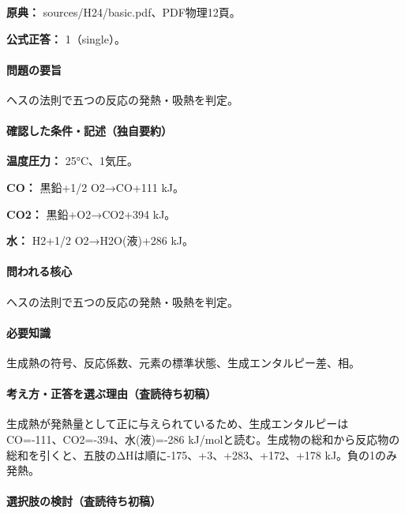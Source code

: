 \noindent\textbf{原典：} sources/H24/basic.pdf、PDF物理12頁。

\textbf{公式正答：} 1（single）。

\paragraph{問題の要旨} ヘスの法則で五つの反応の発熱・吸熱を判定。

\paragraph{確認した条件・記述（独自要約）}\mbox{}\par

\noindent\textbf{温度圧力：} 25°C、1気圧。\par

\noindent\textbf{CO：} 黒鉛+1/2 O2→CO+111 kJ。\par

\noindent\textbf{CO2：} 黒鉛+O2→CO2+394 kJ。\par

\noindent\textbf{水：} H2+1/2 O2→H2O(液)+286 kJ。\par

\paragraph{問われる核心} ヘスの法則で五つの反応の発熱・吸熱を判定。

\paragraph{必要知識} 生成熱の符号、反応係数、元素の標準状態、生成エンタルピー差、相。

\paragraph{考え方・正答を選ぶ理由（査読待ち初稿）} 生成熱が発熱量として正に与えられているため、生成エンタルピーはCO=-111、CO2=-394、水(液)=-286 kJ/molと読む。生成物の総和から反応物の総和を引くと、五肢のΔHは順に-175、+3、+283、+172、+178 kJ。負の1のみ発熱。

\paragraph{選択肢の検討（査読待ち初稿）}\mbox{}\par

